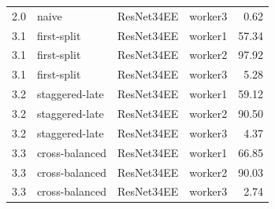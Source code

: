 \begin{table}
\begin{tabular}{llllr}
       2.0 &          naive & ResNet34EE & worker3 &              0.62 \\
       3.1 &    first-split & ResNet34EE & worker1 &             57.34 \\
       3.1 &    first-split & ResNet34EE & worker2 &             97.92 \\
       3.1 &    first-split & ResNet34EE & worker3 &              5.28 \\
       3.2 & staggered-late & ResNet34EE & worker1 &             59.12 \\
       3.2 & staggered-late & ResNet34EE & worker2 &             90.50 \\
       3.2 & staggered-late & ResNet34EE & worker3 &              4.37 \\
       3.3 & cross-balanced & ResNet34EE & worker1 &             66.85 \\
       3.3 & cross-balanced & ResNet34EE & worker2 &             90.03 \\
       3.3 & cross-balanced & ResNet34EE & worker3 &              2.74 \\
\bottomrule
\end{tabular}
\end{table}
